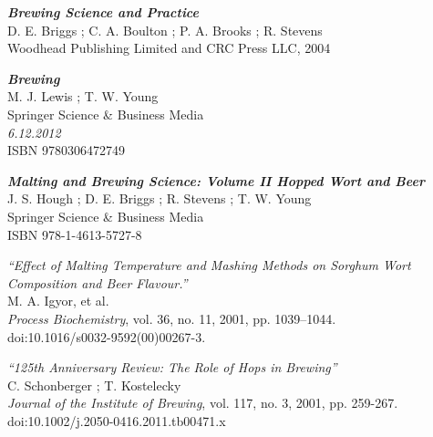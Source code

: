 \documentclass[twoside]{ctuthesis}
\theoremstyle{plain}
\theoremstyle{definition}
\theoremstyle{note}
\begin{document}

%

%







\appendix

%
%
\begin{thebibliography}{9}
	\textit{\textbf{Brewing Science and Practice}}\\
	D. E. Briggs ; C. A. Boulton ; P. A. Brooks ; R. Stevens\\
	Woodhead Publishing Limited and CRC Press LLC, 2004

	\textit{\textbf{Brewing}}\\
	M. J. Lewis ; T. W. Young\\
	Springer Science \& Business Media\\
	\textit{6.12.2012}\\
	ISBN 9780306472749

	\textit{\textbf{Malting and Brewing Science: Volume II Hopped Wort and Beer}}\\
	J. S. Hough ; D. E. Briggs ; R. Stevens ; T. W. Young\\
	Springer Science \& Business Media\\
	ISBN 978-1-4613-5727-8

	\textit{“Effect of Malting Temperature and Mashing Methods on Sorghum Wort Composition and Beer Flavour.”} \\
	M. A. Igyor, et al. \\
	\textit{Process Biochemistry}, vol. 36, no. 11, 2001, pp. 1039–1044.\\
	doi:10.1016/s0032-9592(00)00267-3.

	\textit{“125th Anniversary Review: The Role of Hops in Brewing”}\\
	C. Schonberger ; T. Kostelecky\\
	\textit{Journal of the Institute of Brewing}, vol. 117, no. 3, 2001, pp. 259-267.\\
	doi:10.1002/j.2050-0416.2011.tb00471.x


\end{thebibliography}
\end{document}
